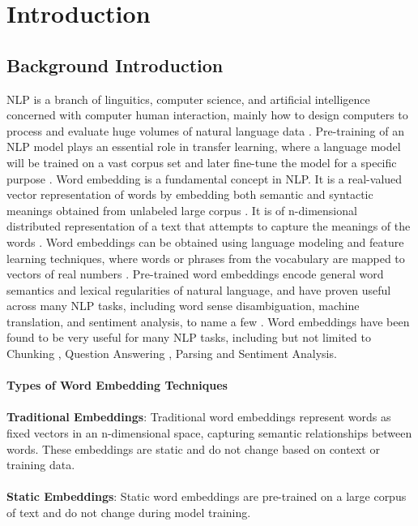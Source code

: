 \chapter{Introduction}
\section{Background Introduction}
NLP is a branch of linguitics, computer science, and artificial intelligence concerned with computer human interaction, mainly how to design computers to process and evaluate huge volumes of natural language data \cite{asudani2023impact}. Pre-training of an NLP model plays an essential role in transfer learning, where a language model will be trained on a vast corpus set and later fine-tune the model for a specific purpose \cite{NepaliBERT}. Word embedding is a fundamental concept in NLP. It is a real-valued vector representation of words by embedding both semantic and syntactic meanings obtained from unlabeled large corpus \cite{Wang_Wang_Chen_Wang_Kuo_2019}. It is of n-dimensional distributed representation of a text that attempts to capture the meanings of the words \cite{asudani2023impact}. Word embeddings can be obtained using language modeling and feature learning techniques, where words or phrases from the vocabulary are mapped to vectors of real numbers \cite{enwiki:1219561882}. Pre-trained word embeddings encode general word semantics and lexical regularities of natural language, and have proven useful across many NLP tasks, including word sense disambiguation, machine translation, and sentiment analysis, to name a few \cite{moreo2019wordclass}. Word embeddings have been found to be very useful for many NLP tasks, including but not limited to Chunking \cite{turian-etal-2010-word}, Question Answering \cite{questionanswer}, Parsing and Sentiment Analysis\cite{sentimentanalysis}. \cite{wordembedding} \\\\
\textbf{Types of Word Embedding Techniques} \cite{reviewOnWordEmbedding} \\\\
\textbf{Traditional Embeddings}: Traditional word embeddings represent words as fixed vectors in an n-dimensional space, capturing semantic relationships between words.
These embeddings are static and do not change based on context or training data. \\\\
\textbf{Static Embeddings}:
Static word embeddings are pre-trained on a large corpus of text and do not change during model training.
